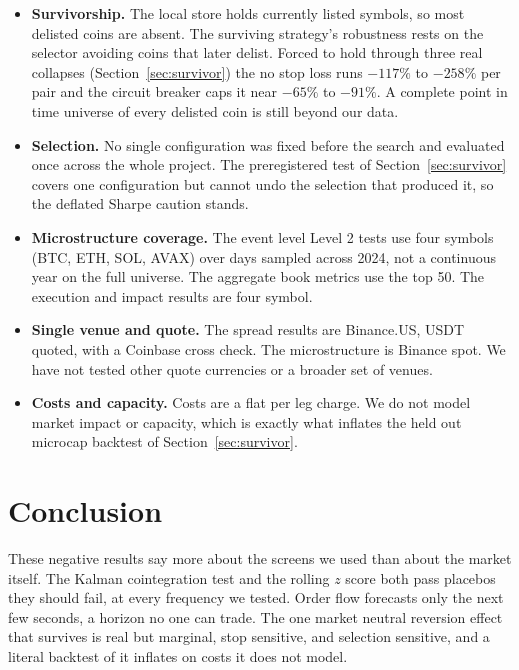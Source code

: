 \documentclass[11pt]{article}
\begin{document}
\begin{itemize}
\item \textbf{Survivorship.} The local store holds currently listed symbols, so most delisted
coins are absent. The surviving strategy's robustness rests on the selector avoiding coins that
later delist. Forced to hold through three real collapses (Section~\ref{sec:survivor}) the no stop
loss runs $-117\%$ to $-258\%$ per pair and the circuit breaker caps it near $-65\%$ to $-91\%$. A
complete point in time universe of every delisted coin is still beyond our data.
\item \textbf{Selection.} No single configuration was fixed before the search and evaluated once
across the whole project. The preregistered test of Section~\ref{sec:survivor} covers one
configuration but cannot undo the selection that produced it, so the deflated Sharpe caution
stands.
\item \textbf{Microstructure coverage.} The event level Level 2 tests use four symbols (BTC, ETH,
SOL, AVAX) over days sampled across 2024, not a continuous year on the full universe. The
aggregate book metrics use the top 50. The execution and impact results are four symbol.
\item \textbf{Single venue and quote.} The spread results are Binance.US, USDT quoted, with a
Coinbase cross check. The microstructure is Binance spot. We have not tested other quote
currencies or a broader set of venues.
\item \textbf{Costs and capacity.} Costs are a flat per leg charge. We do not model market impact
or capacity, which is exactly what inflates the held out microcap backtest of
Section~\ref{sec:survivor}.
\end{itemize}

\section{Conclusion}
\label{sec:conclusion}

These negative results say more about the screens we used than about the market itself. The Kalman cointegration test and the rolling
$z$ score both pass placebos they should fail, at every frequency we tested. Order flow forecasts
only the next few seconds, a horizon no one can trade. The one market neutral reversion effect
that survives is real but marginal, stop sensitive, and selection sensitive, and a literal
backtest of it inflates on costs it does not model.
\end{document}
